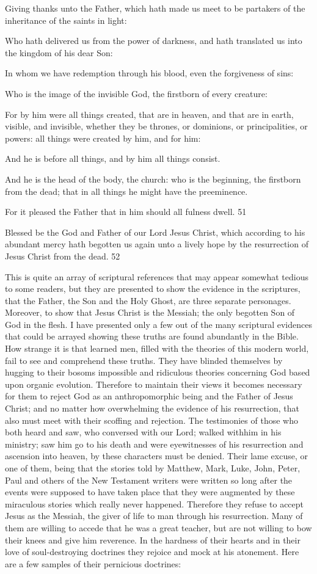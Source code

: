 Giving thanks unto the Father, which hath made us meet to be partakers of the inheritance of
the saints in light:

Who hath delivered us from the power of darkness, and hath translated us into the kingdom
of his dear Son:

In whom we have redemption through his blood, even the forgiveness of sins:

Who is the image of the invisible God, the firstborn of every creature:

For by him were all things created, that are in heaven, and that are in earth, visible, and
invisible, whether they be thrones, or dominions, or principalities, or powers: all things were
created by him, and for him:

And he is before all things, and by him all things consist.

And he is the head of the body, the church: who is the beginning, the firstborn from the dead;
that in all things he might have the preeminence.

For it pleased the Father that in him should all fulness dwell. 51

Blessed be the God and Father of our Lord Jesus Christ, which according to his abundant
mercy hath begotten us again unto a lively hope by the resurrection of Jesus Christ from the
dead. 52

This is quite an array of scriptural references that may appear somewhat tedious to some
readers, but they are presented to show the evidence in the scriptures, that the Father, the Son
and the Holy Ghost, are three separate personages. Moreover, to show that Jesus Christ is the
Messiah; the only begotten Son of God in the flesh. I have presented only a few out of the
many scriptural evidences that could be arrayed showing these truths are found abundantly in
the Bible. How strange it is that learned men, filled with the theories of this modern world,
fail to see and comprehend these truths. They have blinded themselves by hugging to their
bosoms impossible and ridiculous theories concerning God based upon organic evolution.
Therefore to maintain their views it becomes necessary for them to reject God as an
anthropomorphic being and the Father of Jesus Christ; and no matter how overwhelming the
evidence of his resurrection, that also must meet with their scoffing and rejection. The
testimonies of those who both heard and saw, who conversed with our Lord; walked withhim in his ministry; saw him go to his death and were eyewitnesses of his resurrection and
ascension into heaven, by these characters must be denied. Their lame excuse, or one of
them, being that the stories told by Matthew, Mark, Luke, John, Peter, Paul and others of the
New Testament writers were written so long after the events were supposed to have taken
place that they were augmented by these miraculous stories which really never happened.
Therefore they refuse to accept Jesus as the Messiah, the giver of life to man through his
resurrection. Many of them are willing to accede that he was a great teacher, but are not
willing to bow their knees and give him reverence. In the hardness of their hearts and in their
love of soul-destroying doctrines they rejoice and mock at his atonement. Here are a few
samples of their pernicious doctrines:


